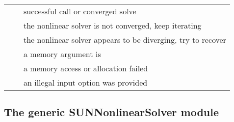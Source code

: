 \newlength{\ColumnOneA}
\newlength{\ColumnTwoA}
\newlength{\ColumnThreeA}
\setlength{\ColumnThreeA}{\textwidth}
\addtolength{\ColumnThreeA}{-0.5in}
\addtolength{\ColumnThreeA}{-\ColumnOneA}
\addtolength{\ColumnThreeA}{-\ColumnTwoA}

\label{t:sunnonlinsol_returncodes}
\begin{xtabular}{|p{\ColumnOneA}|p{\ColumnTwoA}|p{\ColumnThreeA}|}
     &   & successful call or converged solve
\\[1mm]
    &   & the nonlinear solver is not
                                      converged, keep iterating
\\[1mm]
 &   & the nonlinear solver appears to
                                       be diverging, try to recover
\\[1mm]
   &  & a memory argument is 
\\[1mm]
   &  & a memory access or allocation failed
\\[1mm]
  &  & an illegal input option was provided
\\
\end{xtabular}
\bigskip


\subsection{The generic SUNNonlinearSolver module}
\label{ss:sunnonlinsol_generic}


